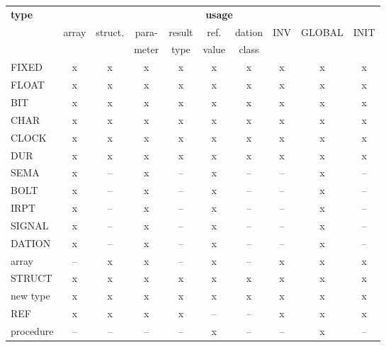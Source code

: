 \begin{table}[htb]
\begin{tabular}{lccccccccc}
{\bf type}     & \multicolumn{9}{c}{{\bf usage}} \\ 
               & array & struct. & para- & result & ref.  & dation & INV & GLOBAL & INIT \\ 
               &       &         & meter & type   & value & class  &     &        &      \\ \hline
FIXED          & x     &  x      & x     &  x     &  x    &   x    &  x  &    x   &  x   \\
FLOAT          & x     &  x      & x     &  x     &  x    &   x    &  x  &    x   &  x   \\
BIT            & x     &  x      & x     &  x     &  x    &   x    &  x  &    x   &  x   \\
CHAR           & x     &  x      & x     &  x     &  x    &   x    &  x  &    x   &  x   \\
CLOCK          & x     &  x      & x     &  x     &  x    &   x    &  x  &    x   &  x   \\
DUR            & x     &  x      & x     &  x     &  x    &   x    &  x  &    x   &  x   \\
SEMA           & x     &  --     & x     &  --    &  x    &   --   &  -- &    x   &  --  \\
BOLT           & x     &  --     & x     &  --    &  x    &   --   &  -- &    x   &  --  \\
IRPT           & x     &  --     & x     &  --    &  x    &   --   &  -- &    x   &  --  \\
SIGNAL         & x     &  --     & x     &  --    &  x    &   --   &  -- &    x   &  --  \\
DATION         & x     &  --     & x     &  --    &  x    &   --   &  -- &    x   &  --  \\
array          & --    &  x      & x     &  --    &  x    &   --   &  x  &    x   &  x   \\
STRUCT         & x     &  x      & x     &  x     &  x    &   x    &  x  &    x   &  x   \\
new type       & x     &  x      & x     &  x     &  x    &   x    &  x  &    x   &  x   \\
REF            & x     &  x      & x     &  x     &  --   &   --   &  x  &    x   &  x   \\
procedure      & --    &  --     & --    &  --    &  x    &   --   &  -- &    x   &  --  \\

\end{tabular}
\end{table}
